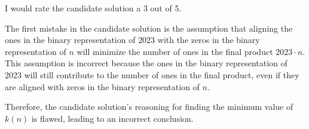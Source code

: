 I would rate the candidate solution a 3 out of 5.

The first mistake in the candidate solution is the assumption that aligning the ones in the binary representation of $2023$ with the zeros in the binary representation of $n$ will minimize the number of ones in the final product $2023 \cdot n$. This assumption is incorrect because the ones in the binary representation of $2023$ will still contribute to the number of ones in the final product, even if they are aligned with zeros in the binary representation of $n$. 

Therefore, the candidate solution's reasoning for finding the minimum value of $k(n)$ is flawed, leading to an incorrect conclusion.
